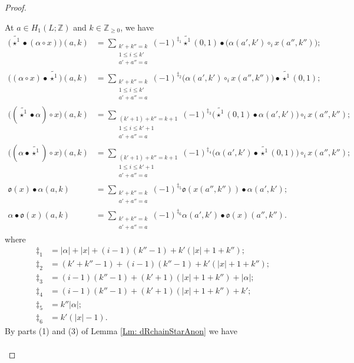 \documentclass[10pt,a4paper]{amsart}
\newcommand{\Z}{\mathbb{Z}}
\newcommand{\wt}[1]{\widetilde{#1}}
\begin{document}
\begin{proof}
\begin{itemize}
	At $a\in H_1(L;\Z)$ and $k\in\Z_{\geq 0}$, we have 
	\begin{align*}
		\big(\wt{\star^1}\bullet (\alpha\circ x)\big)(a,k) &= \sum_{\substack{k'+k''= k\\ 1\leq i \leq k' \\ a'+a''= a}} (-1)^{\ddagger_1} \wt{\star^1}(0,1) \bullet \big( \alpha(a',k')\circ_i x(a'',k'')\big);\\
		\big((\alpha\circ x)\bullet \wt{\star^1}\big)(a,k)
		&= \sum_{\substack{k'+k'' = k\\1\leq i \leq k'\\ a'+a''=a}}(-1)^{\ddagger_2} \big(\alpha(a',k') \circ_i x(a'',k'') \big)\bullet \wt{\star^1}(0,1);\\
		\big((\wt{\star^1}\bullet \alpha)\circ x\big)(a,k)&= \sum_{\substack{(k'+1)+k''=k+1 \\ 1\leq i \leq k'+1 \\ a'+a''=a}}(-1)^{\ddagger_3} \big(\wt{\star^1}(0,1)\bullet \alpha(a',k')\big)\circ_i x(a'',k'');\\
		\big((\alpha\bullet \wt{\star^1}) \circ x\big)(a,k)&= \sum_{\substack{(k'+1)+k''=k+1 \\ 1\leq i \leq k'+1 \\ a'+a''=a}}(-1)^{\ddagger_4} \big( \alpha(a',k')\bullet \wt{\star^1}(0,1) \big) \circ_i x(a'',k'');\\
		\mathfrak{o}(x)\bullet \alpha (a,k) &= \sum_{\substack{k'+k'' = k \\ a'+a'' = a}} (-1)^{\ddagger_5} \mathfrak{o}(x(a'',k'')) \bullet \alpha(a',k');\\
		\alpha\bullet \mathfrak{o}(x)(a,k)&= \sum_{\substack{k'+k''= k\\ a'+a'' = a}} (-1)^{\ddagger_6} \alpha(a',k')\bullet \mathfrak{o}(x)(a'',k'').
	\end{align*}
	where 
	\begin{align*}
		\ddagger_1 &=|\alpha|+|x| + (i-1)(k''-1)+k'(|x|+1+k'');\\
		\ddagger_2 &= (k'+k''-1)+(i-1)(k''-1)+k'(|x|+1+k'');\\
		\ddagger_3 &= (i-1)(k''-1) + (k'+1) (|x|+1+k'') + |\alpha|;\\
		\ddagger_4 &= (i-1)(k''-1) + (k'+1)(|x|+1+k'') + k'; \\
		\ddagger_5 &= k''|\alpha|;\\ 
		\ddagger_6 &= k'(|x|-1).
	\end{align*}
By parts (1) and (3) of Lemma \ref{Lm: dRchainStarAnon} we have 
\begin{align*}

\end{align*}
\end{itemize}
\end{proof}
\end{document}

